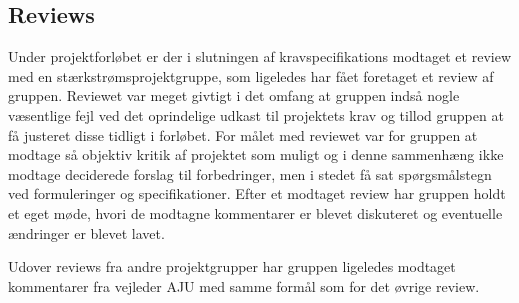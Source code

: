 \subsection{Reviews}
Under projektforløbet er der i slutningen af kravspecifikations modtaget et review\cite{lib:Review1} med en stærkstrømsprojektgruppe, som ligeledes har fået foretaget et review af gruppen.
Reviewet var meget givtigt i det omfang at gruppen indså nogle væsentlige fejl ved det oprindelige udkast til projektets krav og tillod gruppen at få justeret disse tidligt i forløbet.
For målet med reviewet var for gruppen at modtage så objektiv kritik af projektet som muligt og i denne sammenhæng ikke modtage deciderede forslag til forbedringer, men i stedet få sat spørgsmålstegn ved formuleringer og specifikationer.
Efter et modtaget review har gruppen holdt et eget møde, hvori de modtagne kommentarer er blevet diskuteret og eventuelle ændringer er blevet lavet.

Udover reviews fra andre projektgrupper har gruppen ligeledes modtaget kommentarer fra vejleder AJU med samme formål som for det øvrige review.

\clearpage